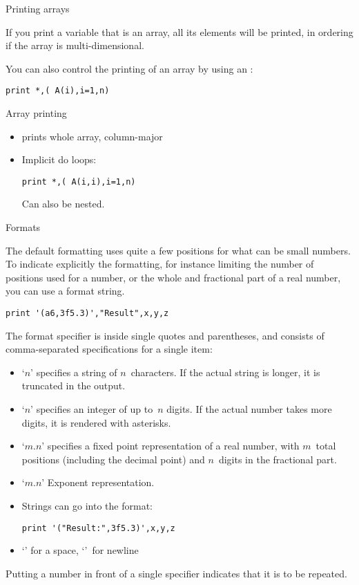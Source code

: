  {Printing arrays}

If you print a variable that is an array, all its elements will be
printed, in  ordering if the array is
multi-dimensional.

You can also control the printing of an array by using an
:
\begin{verbatim}
print *,( A(i),i=1,n)
\end{verbatim}

\begin{slide}{Array printing}
  \label{sl:fprint-array}
  \begin{itemize}
  \item {} prints whole array, column-major
  \item Implicit do loops:
\begin{verbatim}
print *,( A(i,i),i=1,n)
\end{verbatim}
  Can also be nested.
  \end{itemize}
\end{slide}

 {Formats}

The default formatting uses quite a few positions for what can be
small numbers. To indicate explicitly the formatting, for instance
limiting the number of positions used for a number, or the whole and
fractional part of a real number, you can use a format string.
\begin{verbatim}
print '(a6,3f5.3)',"Result",x,y,z
\end{verbatim}
The format specifier is inside single quotes and parentheses, and
consists of comma-separated specifications for a single item:
\begin{itemize}
\item `$n$' specifies a string of $n$~characters. If the actual
  string is longer, it is truncated in the output.
\item `$n$' specifies an integer of up to~$n$ digits. If the actual
  number takes more digits, it is rendered with asterisks.
\item `$m.n$' specifies a fixed point representation of a real
  number, with $m$~total positions (including the decimal point)
  and $n$~digits in the fractional part.
\item `$m.n$' Exponent representation.
\item Strings can go into the format:
\begin{verbatim}
print '("Result:",3f5.3)',x,y,z
\end{verbatim}
\item `' for a space, `\n{/}'~for newline
\end{itemize}
Putting a number in front of a single specifier indicates that it is
to be repeated.

